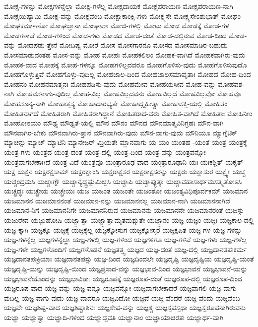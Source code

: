 {ಮೋಕ್ಷ-ಗಳನ್ನು
ಮೋಕ್ಷಗಳನ್ನೆಲ್ಲಾ
ಮೋಕ್ಷ-ಗಳೆಲ್ಲ
ಮೋಕ್ಷದಾಯಕ
ಮೋಕ್ಷಪರಾಯಣ
ಮೋಕ್ಷಪರಾಯಣ-ನಾಗಿ
ಮೋಕ್ಷಯಿಷ್ಯಾಮಿ
ಮೋಕ್ಷ-ವನ್ನು
ಮೋಕ್ಷವೆಂಬ
ಮೋಕ್ಷಾಕಾಂಕ್ಷಿ-ಗಳು
ಮೋಕ್ಷ್ಯಸೇ
ಮೋಕ್ಷ್ಯಸೇಽಶುಭಾತ್
ಮೋಘಂ
ಮೋಘಕರ್ಮಾಣೋ
ಮೋಘಜ್ಞಾನಾ
ಮೋಘಾಶಾ
ಮೋಚಿ-ಗಳಲ್ಲಿ
ಮೋಟು
ಮೋಡ
ಮೋಡಕ್ಕೆ
ಮೋಡ-ಗಳ
ಮೋಡಗಳಾಚೆ
ಮೋಡ-ಗಳಿಂದ
ಮೋಡ-ಗಳು
ಮೋಡದ
ಮೋಡ-ದಂತೆ
ಮೋಡ-ದಲ್ಲಿರುವ
ಮೋಡ-ದಿಂದ
ಮೋಡ-ವನ್ನು
ಮೋದಪಡು-ತ್ತೇನೆ
ಮೋದಿಷ್ಯ
ಮೋರೆ
ಮೋಸ
ಮೋಸಗಾರನೂ
ಮೋಸದ
ಮೋಸಮಾಡಿರ-ಬಹುದು
ಮೋಸಮಾಡುವಂತಹ
ಮೋಸ-ವನ್ನು
ಮೋಹ
ಮೋಹಃ
ಮೋಹಕಲಿಲಂ
ಮೋಹಕ-ವಾಗಿದೆ
ಮೋಹಕವಾಗಿರು-ವುದು
ಮೋಹಕ-ವಾದ
ಮೋಹಕ್ಕೆ
ಮೋಹ-ಗಳನ್ನೂ
ಮೋಹಗಳಿಲ್ಲದವರೂ
ಮೋಹಗೊಳಿಸು-ವುದು
ಮೋಹಗೊಳಿಸುವುದೊ
ಮೋಹಗೊಳ್ಳುತ್ತಿವೆ
ಮೋಹಗೊಳ್ಳು-ವುದಿಲ್ಲ
ಮೋಹಜಾಲ-ದಿಂದ
ಮೋಹಜಾಲಸಮಾವೃತಾಃ
ಮೋಹದ
ಮೋಹ-ದಿಂದ
ಮೋಹನಂ
ಮೋಹನಮಾತ್ಮನಃ
ಮೋಹಪಡಿಸು-ವುದು
ಮೋಹಮೇವ
ಮೋಹಯಸೀವ
ಮೋಹ-ವನ್ನು
ಮೋಹವಶ-ನಾಗಿ
ಮೋಹವಶನಾಗು-ವುದಿಲ್ಲ
ಮೋಹ-ವಿಲ್ಲ
ಮೋಹವಿಲ್ಲದವನು
ಮೋಹವಿಲ್ಲದೆ
ಮೋಹವಿಲ್ಲವೋ
ಮೋಹವೂ
ಮೋಹಶೂನ್ಯ-ನಾಗಿ
ಮೋಹಾತ್ತಸ್ಯ
ಮೋಹಾದಾರಭ್ಯತೇ
ಮೋಹಾದ್ಗೃಹೀತ್ವಾ
ಮೋಹಾಸಕ್ತಿ-ಯಲ್ಲಿ
ಮೋಹಿತಂ
ಮೋಹಿತನಾಗದೆ
ಮೋಹಿತರಾಗಿ
ಮೋಹಿತರಾಗಿದ್ದಾನೆ
ಮೋಹಿತರಾದ-ವರು
ಮೋಹಿತ-ವಾಗಿದೆ
ಮೋಹಿತಾಃ
ಮೋಹಿನೀಂ
ಮೋಹೋಽಯಂ
ಮೌಢ್ಯ
ಮೌಢ್ಯತೆ-ಯಲ್ಲಿ
ಮೌನ
ಮೌನಂ
ಮೌನದ
ಮೌನಮಾತ್ಮವಿನಿಗ್ರಹಃ
ಮೌನ-ವಾಗಿ
ಮೌನವಾಗಿರ-ಬೇಕು
ಮೌನವಾಗಿರು-ತ್ತಾನೆ
ಮೌನವಾಗಿರು-ವುದು
ಮೌನ-ವಾಗು-ವುದು
ಮೌನಿಯೂ
ಮ್ಯಾಗ್ನೆಟಿಕ್
ಮ್ಯಾಚನ್ನು
ಮ್ಯಾಚ್
ಮ್ಯಾಟಿನಿ
ಮ್ಯಾನೇಜರ್
ಮ್ರಿಯತೇ
ಮ್ಲಾನವಾಗು
ಯ
ಯಂ
ಯಂತಹ
-ಯಂತೆ
ಯಂತ್ರ
ಯಂತ್ರಕ್ಕೆ
ಯಂತ್ರ-ಗಳು
ಯಂತ್ರದ
ಯಂತ್ರ-ದಂತೆ
ಯಂತ್ರ-ದಲ್ಲಿ
ಯಂತ್ರ-ದಿಂದ
ಯಂತ್ರ-ವನ್ನು
ಯಂತ್ರವನ್ನೋ
ಯಂತ್ರವಾಗಬೇಕಾಗಿದೆ
ಯಂತ್ರ-ವಿದೆ
ಯಂತ್ರವೂ
ಯಂತ್ರಾರೂಢ-ವಾದ
ಯಂತ್ರಾರೂಢಾನಿ
ಯಃ
ಯಃಕಶ್ಚಿತ್
ಯಕೃತ್
ಯಕ್ಷ
ಯಕ್ಷನ
ಯಕ್ಷರಕ್ಷಸಾಮ್
ಯಕ್ಷರಕ್ಷಾಂಸಿ
ಯಕ್ಷರಾಕ್ಷಸರ
ಯಕ್ಷರಾಕ್ಷಸರನ್ನು
ಯಕ್ಷರು
ಯಕ್ಷಾಸುರ
ಯಕ್ಷ್ಯೇ
ಯಚ್ಚ
ಯಚ್ಚಂದ್ರಮಸಿ
ಯಚ್ಚಾಗ್ನೌ
ಯಚ್ಚಾನ್ಯದ್ದ್ರಷ್ಟುಮಿಚ್ಛಸಿ
ಯಚ್ಚಾಪಿ
ಯಚ್ಚಾಪ್ಯುತ್ಕಾ
ಯಚ್ಚಾವಹಾಸಾರ್ಥಮಸತ್ಕೃತೋಽಸಿ
ಯಚ್ಛ್ರದ್ಧಃ
ಯಚ್ಛ್ರೇಯ
ಯಚ್ಛ್ರೇಯಃ
ಯಜ
ಯಜಂತ
ಯಜಂತೇ
ಯಜಂತೋ
ಯಜಂತ್ಯವಿಧಿಪೂರ್ವಕಮ್
ಯಜಮಾನ
ಯಜಮಾನನ
ಯಜಮಾನನಂತೆ
ಯಜಮಾನ-ನನ್ನು
ಯಜಮಾನನಲ್ಲ
ಯಜಮಾನ-ನಾಗಿ
ಯಜಮಾನನಾಗಿದೆ
ಯಜಮಾನ-ನಿಗೆ
ಯಜಮಾನನಿಗೇ
ಯಜಮಾನನಿರುವ
ಯಜಮಾನನು
ಯಜಮಾನನೇ
ಯಜಮಾನರಂತೆ
ಯಜಸ್ಸು
ಯಜುರೇವ
ಯಜ್ಜುಹೋಷಿ
ಯಜ್ಜ್ಞಾತ್ವಾ
ಯಜ್ಜ್ಞಾತ್ವಾಮೃತಮಶ್ನುತೇ
ಯಜ್ಜ್ಞಾನಂ
ಯಜ್ಞ
ಯಜ್ಞಂ
ಯಜ್ಞಃ
ಯಜ್ಞಕಾಲ-ದಲ್ಲಿ
ಯಜ್ಞ-ಕ್ಕಾಗಿ
ಯಜ್ಞಕ್ಕೂ
ಯಜ್ಞಕ್ಕೆ
ಯಜ್ಞಕ್ಕೆಲ್ಲ
ಯಜ್ಞಕ್ಕೋಸುಗ
ಯಜ್ಞಕ್ಕೋಸ್ಕರ
ಯಜ್ಞಕ್ಷಪಿತ
ಯಜ್ಞ-ಗಳ
ಯಜ್ಞ-ಗಳನ್ನು
ಯಜ್ಞ-ಗಳನ್ನೆಲ್ಲ
ಯಜ್ಞಗಳನ್ನೆಲ್ಲಾ
ಯಜ್ಞ-ಗಳಲ್ಲಿ
ಯಜ್ಞ-ಗಳಿಂದ
ಯಜ್ಞಗಳಿಗೂ
ಯಜ್ಞ-ಗಳಿವೆ
ಯಜ್ಞ-ಗಳು
ಯಜ್ಞ-ಗಳೆಲ್ಲ
ಯಜ್ಞ-ಗಳೇ
ಯಜ್ಞಗಳೊಂದಿಗೆ
ಯಜ್ಞಗಳೊಡನೆ
ಯಜ್ಞತತ್ತ್ವ
ಯಜ್ಞದ
ಯಜ್ಞ-ದಂತೆ
ಯಜ್ಞ-ದಲ್ಲಿ
ಯಜ್ಞದಾನತಪಃಕರ್ಮ
ಯಜ್ಞದಾನತಪಃಕ್ರಿಯಾಃ
ಯಜ್ಞದಾನತಪಸ್ಸು
ಯಜ್ಞ-ದಿಂದ
ಯಜ್ಞದಿಂದಲೇ
ಯಜ್ಞದೃಷ್ಟಿ
ಯಜ್ಞದೃಷ್ಟಿಯ
ಯಜ್ಞದೃಷ್ಟಿ-ಯಂತೆ
ಯಜ್ಞದೃಷ್ಟಿ-ಯನ್ನು
ಯಜ್ಞದೃಷ್ಟಿ-ಯಿಂದ
ಯಜ್ಞಪ್ರಸಾದ-ವನ್ನು
ಯಜ್ಞಭಾವ-ದಿಂದ
ಯಜ್ಞಭಾವನೆ
ಯಜ್ಞಭಾವನೆ-ಯನ್ನು
ಯಜ್ಞಭಾವನೆಯೊಂದನ್ನು
ಯಜ್ಞಭಾವಿತಾಃ
ಯಜ್ಞರೂಪಕ್ಕೆ
ಯಜ್ಞರೂಪ-ದಂತೆ
ಯಜ್ಞರೂಪ-ದಲ್ಲಿ
ಯಜ್ಞರೂಪ-ದಿಂದ
ಯಜ್ಞರೂಪ-ವಾದ
ಯಜ್ಞ-ವನ್ನು
ಯಜ್ಞ-ವನ್ನೂ
ಯಜ್ಞವನ್ನೋ
ಯಜ್ಞವಾಗಬೇಕಾದರೆ
ಯಜ್ಞವಾಗಲಿ
ಯಜ್ಞ-ವಾಗು-ವುದಿಲ್ಲ
ಯಜ್ಞ-ವಾಗು-ವುದು
ಯಜ್ಞ-ವಾದರೂ
ಯಜ್ಞವಿದೋ
ಯಜ್ಞವೆ
ಯಜ್ಞ-ವೆಂದರೆ
ಯಜ್ಞ-ವೆಂದು
ಯಜ್ಞವೆಂಬ
ಯಜ್ಞವೇ
ಯಜ್ಞಶಿಷ್ಟ-ವಾದ
ಯಜ್ಞಶಿಷ್ಟಾಶಿನಃ
ಯಜ್ಞಶೇಷ-ವನ್ನು
ಯಜ್ಞಶ್ಚ
ಯಜ್ಞಸ್ತಪಸ್ತಥಾ
ಯಜ್ಞಸ್ವರೂಪನಾಗಿರುವನು
ಯಜ್ಞಾ
ಯಜ್ಞಾತ್ವಾ
ಯಜ್ಞಾದಿ-ಗಳಿಂದ
ಯಜ್ಞಾದ್ಭವತಿ
ಯಜ್ಞಾನಾಂ
ಯಜ್ಞಾಯಾಚರತಃ
ಯಜ್ಞಾರ್ಥ-ವಾಗಿ
}

